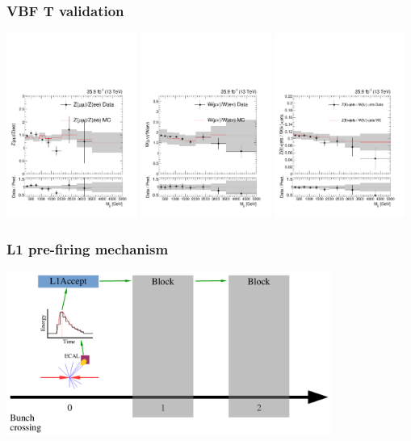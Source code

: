 \documentclass[aspectratio=169,xcolor=dvipsnames,,table,compress]{beamer}
\begin{document}
\begin{frame} \frametitle{VBF $\bm{T}$ validation}
            \includegraphics[width=0.32\textwidth]{../figures/vbf/fits/dimuon_dielectron_cat_vbf_ratio.pdf}
            \includegraphics[width=0.32\textwidth]{../figures/vbf/fits/singlemuon_singleelectron_cat_vbf_ratio.pdf}
            \includegraphics[width=0.32\textwidth]{../figures/vbf/fits/combined_combinedW_cat_vbf_ratio.pdf}
\end{frame}

\begin{frame} \frametitle{L1 pre-firing mechanism}
  \vspace{-5mm}
  \centering
        \includegraphics[width=0.8\textwidth,page=2]{../figures/vbf/triggers/l1diag.pdf}
\end{frame}
\end{document}
